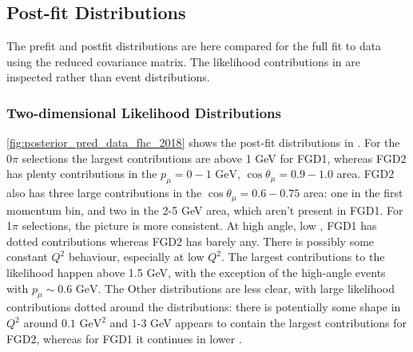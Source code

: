 \subsection{Post-fit Distributions}
The prefit and postfit distributions are here compared for the full fit to data using the reduced covariance matrix. The likelihood contributions in \pmu \cosmu are inspected rather than event distributions.

\subsubsection{Two-dimensional Likelihood Distributions}
\autoref{fig:posterior_pred_data_fhc_2018} shows the post-fit distributions in \pmu \cosmu. For the 0$\pi$ selections the largest contributions are above 1 GeV for FGD1, whereas FGD2 has plenty contributions in the $p_\mu = 0-1\text{ GeV}$, $\cos\theta_\mu=0.9-1.0$ area. FGD2 also has three large contributions in the $\cos\theta_\mu=0.6-0.75$ area: one in the first momentum bin, and two in the 2-5 GeV area, which aren't present in FGD1. For 1$\pi$ selections, the picture is more consistent. At high angle, low \pmu, FGD1 has dotted contributions whereas FGD2 has barely any. There is possibly some constant $Q^2$ behaviour, especially at low $Q^2$. The largest contributions to the likelihood happen above 1.5 GeV, with the exception of the high-angle events with $p_\mu \sim0.6\text{ GeV}$. The Other distributions are less clear, with large likelihood contributions dotted around the distributions: there is potentially some shape in $Q^2$ around $0.1\text{ GeV}^2$ and 1-3 GeV appears to contain the largest contributions for FGD2, whereas for FGD1 it continues in lower \pmu.
